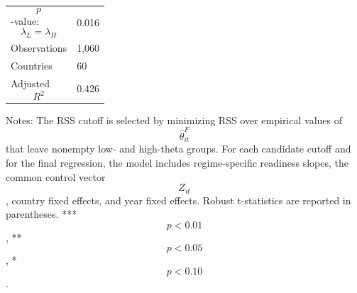 \begin{table}[H]
\begin{threeparttable}
\begin{tabularx}{\textwidth}{lY}
$$p$$-value: $$\lambda_L=\lambda_H$$ & 0.016 \\
Observations & 1,060 \\
Countries & 60 \\
Adjusted $$R^2$$ & 0.426 \\
\bottomrule
\end{tabularx}
\begin{tablenotes}[flushleft]\footnotesize
\item Notes: The RSS cutoff is selected by minimizing RSS over empirical values of $$\widehat{\theta}^{F}_{it}$$ that leave nonempty low- and high-theta groups. For each candidate cutoff and for the final regression, the model includes regime-specific readiness slopes, the common control vector $$Z_{it}$$, country fixed effects, and year fixed effects. Robust t-statistics are reported in parentheses. *** $$p<0.01$$, ** $$p<0.05$$, * $$p<0.10$$.
\end{tablenotes}
\end{threeparttable}
\end{table}
